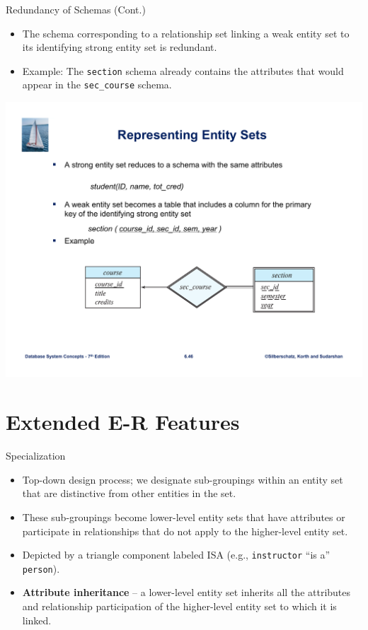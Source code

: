 \documentclass{beamer}
\begin{document}
\begin{frame}{Redundancy of Schemas (Cont.)}
    \begin{itemize}
        \item The schema corresponding to a relationship set linking a weak entity set to its identifying strong entity set is redundant.
        \item Example: The \texttt{section} schema already contains the attributes that would appear in the \texttt{sec\_course} schema.
    \end{itemize}
    \centering
    \includegraphics[trim={5cm 5cm 3cm 12cm}, clip, width=\textwidth]{figures/weak_entities}
\end{frame}

\section{Extended E-R Features}

\begin{frame}{Specialization}
    \begin{itemize}
        \item Top-down design process; we designate sub-groupings within an entity set that are distinctive from other entities in the set.
        \item These sub-groupings become lower-level entity sets that have attributes or participate in relationships that do not apply to the higher-level entity set.
        \item Depicted by a triangle component labeled ISA (e.g., \texttt{instructor} ``is a'' \texttt{person}).
        \item \textbf{Attribute inheritance} – a lower-level entity set inherits all the attributes and relationship participation of the higher-level entity set to which it is linked.
    \end{itemize}
\end{frame}
\end{document}
